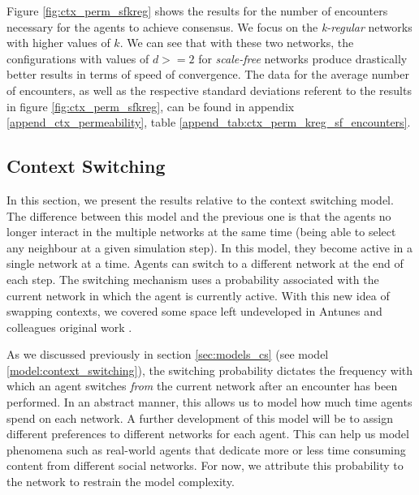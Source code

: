\documentclass[preprint,number]{elsarticle}
\begin{document}
      Figure \ref{fig:ctx_perm_sfkreg} shows the results for the number of encounters necessary for
      the agents to achieve consensus. We focus on the \textit{k-regular} networks with higher
      values of $k$. We can see that with these two networks, the configurations with values of
      $d>=2$ for \textit{scale-free} networks produce drastically better results in terms of speed
      of convergence. The data for the average number of encounters, as well as the respective
      standard deviations referent to the results in figure \ref{fig:ctx_perm_sfkreg}, can be found
      in appendix \ref{append_ctx_permeability}, table \ref{append_tab:ctx_perm_kreg_sf_encounters}.



\subsection{Context Switching}
\noindent In this section, we present the results relative to the context switching model. The difference between this model and the previous one is that the agents no longer interact in the multiple networks at the same time (being able to select any neighbour at a given simulation step). In this model, they become active in a single network at a time. Agents can switch to a different network at the end of each step. The switching mechanism uses a probability associated with the current network in which the agent is currently active. With this new idea of swapping contexts, we covered some space left undeveloped in Antunes and colleagues original work \cite{Antunes2007,Antunes2010}. 

As we discussed previously in section \ref{sec:models_cs} (see model \ref{model:context_switching}), the switching probability dictates the frequency with which an agent switches \textit{from} the current network after an encounter has been performed. In an abstract manner, this allows us to model how much time agents spend on each network. A further development of this model will be to assign different preferences to different networks for each agent. This can help us model phenomena such as real-world agents that dedicate more or less time consuming content from different social networks. For now, we attribute this probability to the network to restrain the model complexity.
\end{document}
